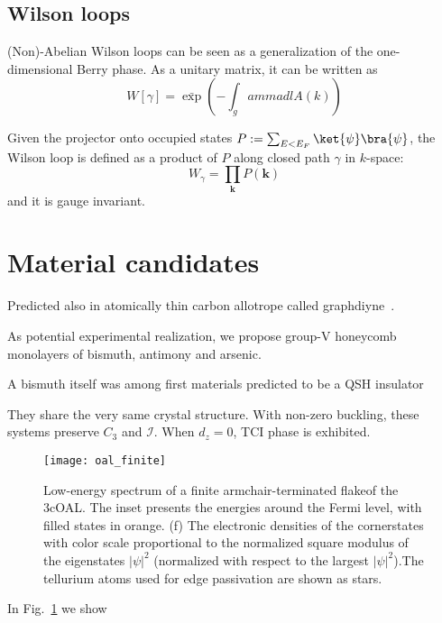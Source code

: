 \subsection{Wilson loops}
(Non)-Abelian Wilson loops can be seen as a generalization of the one-dimensional Berry phase. As a unitary matrix, it can be written as 
\begin{equation}
W[\gamma] = \bar{\exp} \left( - \int_gamma d l A (k) \right)
\end{equation}

Given the projector onto occupied states $P:= \sum_{E < E_F} \ket{\psi} \bra{\psi}$, the Wilson loop is defined as a product of $P$ along closed path $\gamma$ in $k$-space:
\begin{equation}
W_{\gamma} = \prod_{\mathbf{k}} P ( \mathbf{k}) 
\label{eq:wilson}
\end{equation}
and it is gauge invariant.

\section{Material candidates}
Predicted also in atomically thin carbon allotrope called graphdiyne~\cite{GDY12019, GDY22019}.


As potential experimental realization, we propose group-V honeycomb monolayers of bismuth, antimony and arsenic. 

A bismuth itself was among first materials predicted to be a QSH insulator~\cite{MurakamiBi2006}


They share the very same crystal structure. With non-zero buckling, these systems preserve $C_3$ and $\mathcal{I}$. When $d_z = 0$, TCI phase is exhibited.


\begin{figure}
\centering
\texttt{[image: oal\_finite]}
\caption{Low-energy spectrum of a finite armchair-terminated flakeof the 3cOAL. The inset presents the energies around the Fermi level, with filled states in orange. (f) The electronic densities of the cornerstates with color scale proportional to the normalized square modulus of the eigenstates $|\psi|^2$ (normalized with respect to the largest $|\psi|^2$).The tellurium atoms used for edge passivation are shown as stars.}
\label{fig:oal_finite}
\end{figure}


In Fig.~\ref{fig:oal_finite} we show
